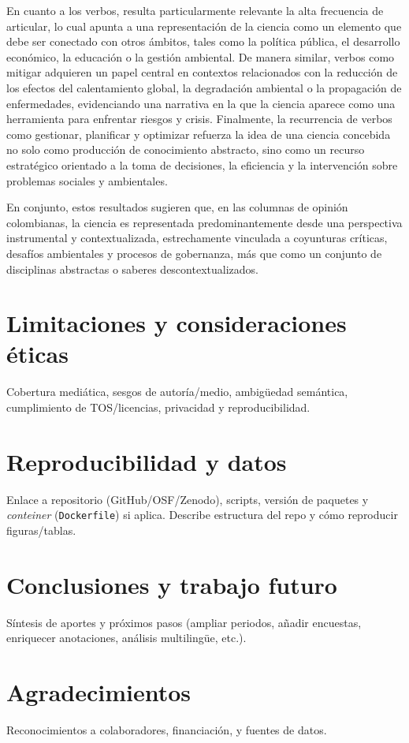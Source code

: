 \documentclass[11pt,a4paper]{article}
\begin{document}
En cuanto a los verbos, resulta particularmente relevante la alta frecuencia de articular, lo cual apunta a una representación de la ciencia como un elemento que debe ser conectado con otros ámbitos, tales como la política pública, el desarrollo económico, la educación o la gestión ambiental. De manera similar, verbos como mitigar adquieren un papel central en contextos relacionados con la reducción de los efectos del calentamiento global, la degradación ambiental o la propagación de enfermedades, evidenciando una narrativa en la que la ciencia aparece como una herramienta para enfrentar riesgos y crisis. Finalmente, la recurrencia de verbos como gestionar, planificar y optimizar refuerza la idea de una ciencia concebida no solo como producción de conocimiento abstracto, sino como un recurso estratégico orientado a la toma de decisiones, la eficiencia y la intervención sobre problemas sociales y ambientales.

En conjunto, estos resultados sugieren que, en las columnas de opinión colombianas, la ciencia es representada predominantemente desde una perspectiva instrumental y contextualizada, estrechamente vinculada a coyunturas críticas, desafíos ambientales y procesos de gobernanza, más que como un conjunto de disciplinas abstractas o saberes descontextualizados.
	
	
	\section{Limitaciones y consideraciones éticas}
	Cobertura mediática, sesgos de autoría/medio, ambigüedad semántica, cumplimiento de TOS/licencias, privacidad y reproducibilidad.
	
	\section{Reproducibilidad y datos}
	Enlace a repositorio (GitHub/OSF/Zenodo), scripts, versión de paquetes y \emph{conteiner} (\texttt{Dockerfile}) si aplica. 
	Describe estructura del repo y cómo reproducir figuras/tablas.
	
	\section{Conclusiones y trabajo futuro}
	Síntesis de aportes y próximos pasos (ampliar periodos, añadir encuestas, enriquecer anotaciones, análisis multilingüe, etc.).
	
	\section*{Agradecimientos}
	Reconocimientos a colaboradores, financiación, y fuentes de datos.
	
	

	
	
	\appendix

	
\end{document}
